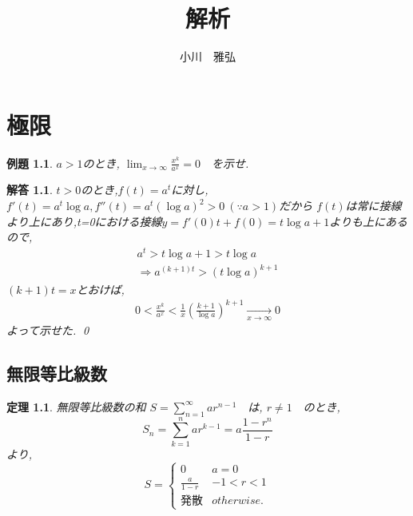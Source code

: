 \documentclass[a4paper,11pt,twocolumn,uplatex]{jsbook}
\newtheorem{thm}{定理}[section]
\newtheorem{example}{例題}[section]
\newtheorem*{solution}{解答}
\begin{document}
\title{解析}
\author{小川　雅弘}
\maketitle


\chapter{極限}

\begin{screen}
  \begin{example}
    $a>1$のとき, $\lim_{x \to \infty} \frac{x^k}{a^x} = 0$　を示せ.
  \end{example}
\end{screen}
\begin{solution}
  $t>0$のとき,$f(t)=a^t$に対し,$f'(t)=a^t \log a, f''(t)=a^t (\log a)^2 > 0 \ (\because a>1)$だから
  $f(t)$は常に接線より上にあり,t=0における接線$y=f'(0)t+f(0) = t \log a + 1$よりも上にあるので,
  \begin{eqnarray*}
    a^t > t\log a + 1 > t\log a \\
    \Rightarrow a^{(k+1)t} > (t \log a)^{k+1}
  \end{eqnarray*}
  $(k+1)t=x$とおけば,
  \begin{eqnarray*}
    0 < \frac{x^k}{a^x} < \frac{1}{x} \left( \frac{k+1}{\log a} \right)^{k+1} 
    \xrightarrow[x \to \infty]{} 0
  \end{eqnarray*}
  よって示せた. \qed
\end{solution}

\section{無限等比級数}

\begin{screen}
  \begin{thm}
    無限等比級数の和 $S = \sum_{n=1}^\infty a r^{n-1}$　は, 
    $r \neq 1$　のとき,
    \begin{equation}
      S_n = \sum_{k=1}^n a r^{k-1} = a \frac{1-r^n}{1-r}
    \end{equation}
    より,
    \begin{equation}
      S =
      \begin{cases}
        0 & a=0\\
        \frac{a}{1-r} & -1<r<1\\
        発散 & otherwise.
      \end{cases}
    \end{equation}
  \end{thm}
\end{screen}
\end{document}
